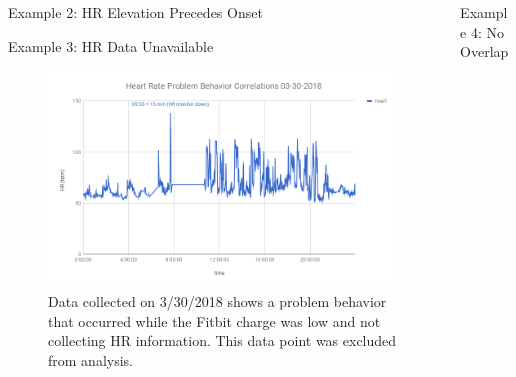 \documentclass[final]{beamer}
\newlength{\onecolwid}
\newlength{\twocolwid}
\begin{document}
\begin{frame}[t]
\begin{columns}[t]
\begin{column}{\twocolwid}
\begin{columns}[t,totalwidth=\twocolwid]
\begin{column}{\onecolwid}
\begin{block}{Example 2: HR Elevation Precedes Onset}
\end{block}


\begin{block}{Example 3: HR Data Unavailable}
	
	\begin{figure}
		\includegraphics[width=0.8\linewidth]{Example3.png}
		\caption{Data collected on 3/30/2018 shows a problem behavior that occurred while the Fitbit charge was low and not collecting HR information. This data point was excluded from analysis.}
	\end{figure}
	
\end{block}


\end{column} %


\begin{column}{\onecolwid}\vspace{-.6in} %


\begin{block}{Example 4: No Overlap}
	

\end{block}
\end{column}
\end{columns}
\end{column}
\end{columns}
\end{frame}
\end{document}
